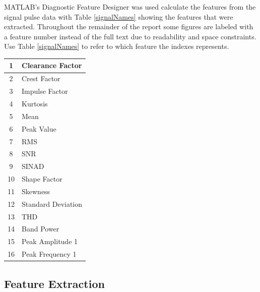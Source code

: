 \documentclass[]{article}
\begin{document}
MATLAB's Diagnostic Feature Designer was used calculate the features from the signal pulse data with Table \ref{signalNames} showing the features that were extracted. Throughout the remainder of the report some figures are labeled with a feature number instead of the full text due to readability and space constraints. Use Table \ref{signalNames} to refer to which feature the indexes represents.

\begin{center}
\label{featureNames}
\begin{tabular}{ |c|l| }
 \hline
 1 & Clearance Factor \\
 \hline
 2 & Crest Factor \\
 \hline
 3 & Impulse Factor \\
 \hline
 4 & Kurtosis \\
 \hline
 5 & Mean \\
 \hline
 6 & Peak Value \\
 \hline
 7 & \gls{RMS} \\ 
 \hline              
 8 & \gls{SNR}  \\
 \hline
 9 & \gls{SINAD}  \\
 \hline
 10 & Shape Factor \\
 \hline
 11 & Skewness \\
 \hline
 12 & Standard Deviation \\
 \hline
 13 & \gls{THD} \\
 \hline
 14 & Band Power \\
 \hline
 15 & Peak Amplitude 1 \\
 \hline
 16 & Peak Frequency 1 \\
 \hline
\end{tabular}
\end{center}

\subsection{Feature Extraction}
\end{document}
